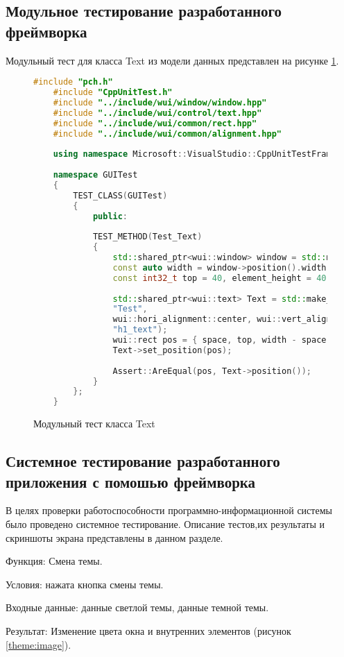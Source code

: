 \subsection{Модульное тестирование разработанного фреймворка}

Модульный тест для класса Text из модели данных представлен на рисунке \ref{classText:image}.

\begin{figure}[ht]
\begin{lstlisting}[language=C++]
	#include "pch.h"
	#include "CppUnitTest.h"
	#include "../include/wui/window/window.hpp"
	#include "../include/wui/control/text.hpp"
	#include "../include/wui/common/rect.hpp"
	#include "../include/wui/common/alignment.hpp"
	
	using namespace Microsoft::VisualStudio::CppUnitTestFramework;
	
	namespace GUITest
	{
		TEST_CLASS(GUITest)
		{
			public:
			
			TEST_METHOD(Test_Text)
			{
				std::shared_ptr<wui::window> window = std::make_shared<wui::window>();
				const auto width = window->position().width(), height = window->position().height();
				const int32_t top = 40, element_height = 40, space = 30;
				
				std::shared_ptr<wui::text> Text = std::make_shared<wui::text>(
				"Test",
				wui::hori_alignment::center, wui::vert_alignment::center,
				"h1_text");
				wui::rect pos = { space, top, width - space, top + element_height };
				Text->set_position(pos);
				
				Assert::AreEqual(pos, Text->position());
			}
		};
	}
\end{lstlisting}  
\caption{Модульный тест класса Text}
\label{classText:image}
\end{figure}

\subsection{Системное тестирование разработанного приложения с помошью фреймворка}
В целях проверки работоспособности программно-информационной системы было проведено системное тестирование. Описание тестов,их результаты и скриншоты экрана представлены в данном разделе.

Функция: Смена темы.

Условия: нажата кнопка смены темы.

Входные данные: данные светлой темы, данные темной темы.

Результат: Изменение цвета окна и внутренних элементов (рисунок \ref{theme:image}).

